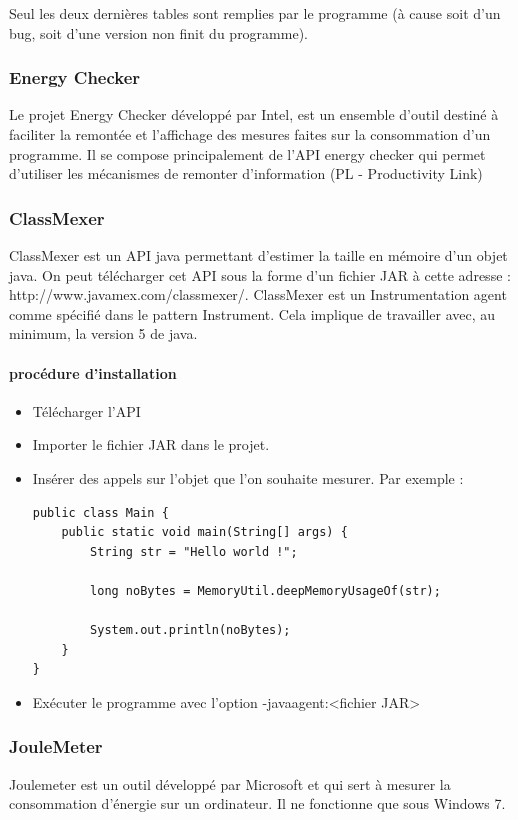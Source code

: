 \documentclass[a4paper, 11pt]{report}
\begin{document}
Seul les deux dernières tables sont remplies par le programme (à cause soit d’un bug, soit d’une version non finit du programme).

\subsubsection{Energy Checker}
Le projet Energy Checker développé par Intel, est un ensemble d’outil destiné à faciliter la remontée et l’affichage des mesures faites sur la consommation d’un programme. Il se compose principalement de l’API energy checker qui permet d’utiliser les mécanismes de remonter d’information (PL - Productivity Link)

\subsubsection{ClassMexer}
ClassMexer est un API java permettant d’estimer la taille en mémoire d’un objet java. On peut télécharger cet API sous la forme d’un fichier JAR à cette adresse : http://www.javamex.com/classmexer/. ClassMexer est un Instrumentation agent comme spécifié dans le pattern Instrument. Cela implique de travailler avec, au minimum, la version 5 de java.

\paragraph{procédure d'installation}
\begin{itemize}
	\item Télécharger l’API
	\item Importer le fichier JAR dans le projet.
	\item Insérer des appels sur l’objet que l’on souhaite mesurer. Par exemple :
\begin{verbatim}
public class Main {
	public static void main(String[] args) {
		String str = "Hello world !";
		
		long noBytes = MemoryUtil.deepMemoryUsageOf(str);
		
		System.out.println(noBytes);
	}
}
\end{verbatim}
	\item Exécuter le programme avec l’option -javaagent:<fichier JAR>
\end{itemize}

\subsubsection{JouleMeter}
Joulemeter est un outil développé par Microsoft et qui sert à mesurer la consommation d’énergie sur un ordinateur. Il ne fonctionne que sous Windows 7.
\end{document}
